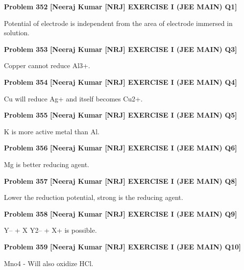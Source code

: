 \begin{problembox}
\textbf{Problem 352} \hfill \textbf{[Neeraj Kumar [NRJ] EXERCISE I (JEE MAIN) Q1]}
\label{q:ext-nrj_all_questions-352}

Potential of electrode is independent from the 
area of electrode immersed in solution.
\end{problembox}

\begin{problembox}
\textbf{Problem 353} \hfill \textbf{[Neeraj Kumar [NRJ] EXERCISE I (JEE MAIN) Q3]}
\label{q:ext-nrj_all_questions-353}

Copper cannot reduce Al3+.
\end{problembox}

\begin{problembox}
\textbf{Problem 354} \hfill \textbf{[Neeraj Kumar [NRJ] EXERCISE I (JEE MAIN) Q4]}
\label{q:ext-nrj_all_questions-354}

Cu will reduce Ag+ and itself becomes Cu2+.
\end{problembox}

\begin{problembox}
\textbf{Problem 355} \hfill \textbf{[Neeraj Kumar [NRJ] EXERCISE I (JEE MAIN) Q5]}
\label{q:ext-nrj_all_questions-355}

K is more active metal than Al.
\end{problembox}

\begin{problembox}
\textbf{Problem 356} \hfill \textbf{[Neeraj Kumar [NRJ] EXERCISE I (JEE MAIN) Q6]}
\label{q:ext-nrj_all_questions-356}

Mg is better reducing agent.
\end{problembox}

\begin{problembox}
\textbf{Problem 357} \hfill \textbf{[Neeraj Kumar [NRJ] EXERCISE I (JEE MAIN) Q8]}
\label{q:ext-nrj_all_questions-357}

Lower the reduction potential, strong is the 
reducing agent.
\end{problembox}

\begin{problembox}
\textbf{Problem 358} \hfill \textbf{[Neeraj Kumar [NRJ] EXERCISE I (JEE MAIN) Q9]}
\label{q:ext-nrj_all_questions-358}

Y-- + X 
 Y2-- + X+ is possible.
\end{problembox}

\begin{problembox}
\textbf{Problem 359} \hfill \textbf{[Neeraj Kumar [NRJ] EXERCISE I (JEE MAIN) Q10]}
\label{q:ext-nrj_all_questions-359}

Mno4
- Will also oxidize HCl.
\end{problembox}

